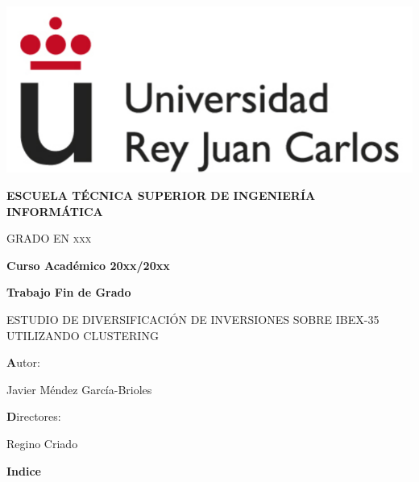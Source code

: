 \documentclass[12pt, letterpaper, twoside]{article}
\begin{document}
\begin{titlepage}
	\centering
	{\includegraphics[scale=0.5]{logo}\par}
	\vspace{1cm}
	{\bfseries\large ESCUELA TÉCNICA SUPERIOR DE INGENIERÍA INFORMÁTICA \par}
	\vspace{1cm}
	{\scshape\large GRADO EN xxx \par}
	\vspace{1cm}
	{\bfseries\large Curso Académico 20xx/20xx \par}
	\vspace{1cm}
	{\bfseries\large  Trabajo Fin de Grado \par}
	\vspace{2cm}
	{\scshape\large ESTUDIO DE DIVERSIFICACIÓN DE INVERSIONES SOBRE IBEX-35 UTILIZANDO CLUSTERING\par}
	\vspace{2cm}
	\vfill
	{\normalsize\textbf Autor: \par}
	{\normalsize Javier Méndez García-Brioles \par}
	{\normalsize\textbf Directores: \par}
	{\normalsize Regino Criado \par}
\end{titlepage}




	\vspace{1cm}
	{\bfseries\large Indice \par}
	\vspace{1cm}
	\tableofcontents

\pagebreak
	
\end{document}
